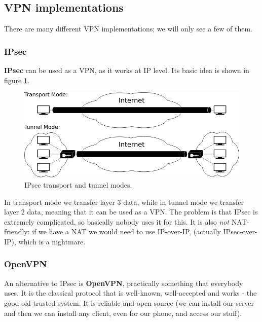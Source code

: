 
\subsection{VPN implementations}
There are many different VPN implementations; we will only see a few of them.


\subsubsection*{IPsec}
\textbf{IPsec} can be used as a VPN, as it works at IP level. Its basic idea is shown in figure \ref{fig:ipsec_vpn}.

\begin{figure}[h]
    \centering
    \includegraphics[scale=0.5]{img/ipsec_vpn.png}
    \decoRule
    \caption{IPsec transport and tunnel modes.}
    \label{fig:ipsec_vpn}
\end{figure}

In transport mode we transfer layer 3 data, while in tunnel mode we transfer layer 2 data, meaning that it can be used as a VPN. The problem is that IPsec is extremely complicated, so basically nobody uses it for this. It is also \textit{not} NAT-friendly: if we have a NAT we would need to use IP-over-IP, (actually IPsec-over-IP), which is a nightmare.


\subsubsection*{OpenVPN}
An alternative to IPsec is \textbf{OpenVPN}, practically something that everybody uses. It is the classical protocol that is well-known, well-accepted and works - the good old trusted system. It is reliable and open source (we can install our server and then we can install any client, even for our phone, and access our stuff).

